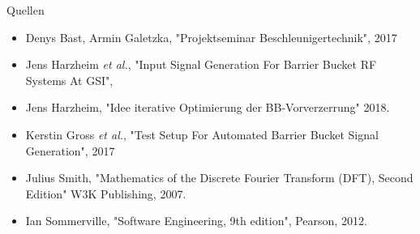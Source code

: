 \begin{frame}{Quellen}

\begin{itemize}
	\item Denys Bast, Armin Galetzka, "Projektseminar Beschleunigertechnik", 2017
	\item Jens Harzheim \textit{et al.}, "Input Signal Generation For Barrier Bucket RF Systems At GSI", 
	\item Jens Harzheim,
	"Idee iterative Optimierung der BB-Vorverzerrung"
	2018.
	\item Kerstin Gross \textit{et al.}, "Test Setup For Automated Barrier Bucket Signal Generation", 2017

	\item Julius Smith,	"Mathematics of the Discrete Fourier Transform (DFT), Second Edition"
	W3K Publishing, 
	2007.
	
	\item Ian Sommerville,
	"Software Engineering, 9th edition",
	Pearson,
	2012.
	
\end{itemize}


\end{frame}



